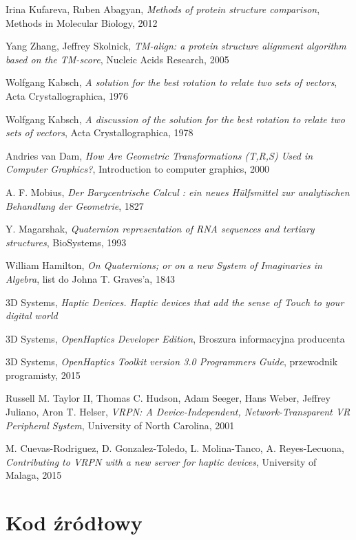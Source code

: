 \documentclass[licencjacka]{pracamgr}
\begin{document}
\begin{thebibliography}{99}
 Irina Kufareva, Ruben Abagyan, \textit{Methods of protein structure comparison}, Methods in Molecular Biology, 2012

 Yang Zhang, Jeffrey Skolnick, \textit{TM-align: a protein structure alignment algorithm based on the TM-score}, Nucleic Acids Research, 2005

 Wolfgang Kabsch, \textit{A solution for the best rotation to relate two sets of vectors}, Acta Crystallographica, 1976

 Wolfgang Kabsch, \textit{A discussion of the solution for the best rotation to relate two sets of vectors}, Acta Crystallographica, 1978

 Andries van Dam, \textit{How Are Geometric
Transformations (T,R,S) Used in Computer Graphics?}, Introduction to computer graphics, 2000

 A. F. Mobius, \textit{Der Barycentrische Calcul : ein neues Hülfsmittel zur analytischen Behandlung der Geometrie}, 1827

 Y. Magarshak, \textit{Quaternion representation of RNA sequences and tertiary structures}, BioSystems, 1993

 William Hamilton, \textit{On Quaternions; or on a new System of Imaginaries in Algebra}, list do Johna T. Graves'a, 1843

 3D Systems, \textit{Haptic Devices. Haptic devices that add the sense of Touch to your digital world}

 3D Systems, \textit{OpenHaptics Developer Edition}, Broszura informacyjna producenta

 3D Systems, \textit{OpenHaptics Toolkit version 3.0 Programmers Guide}, przewodnik programisty, 2015

 Russell M. Taylor II, Thomas C. Hudson, Adam Seeger, Hans Weber, Jeffrey Juliano, Aron T. Helser, \textit{VRPN: A Device-Independent, Network-Transparent VR Peripheral System}, University of North Carolina, 2001

 M. Cuevas-Rodriguez, D. Gonzalez-Toledo, L. Molina-Tanco, A. Reyes-Lecuona, \textit{Contributing to VRPN with a new server for haptic devices}, University of Malaga, 2015

\end{thebibliography}

\chapter*{Kod źródłowy}

\end{document}
